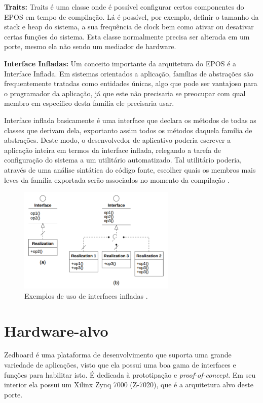 \documentclass{ufscThesis/ufscThesis} %
\begin{document}
\textbf{Traits:} Traits é uma classe onde é possível configurar certos componentes do EPOS em tempo de compilação. Lá é possível, por exemplo, definir o tamanho da stack e heap do sistema, a sua frequência de clock bem como ativar ou desativar certas funções do sistema. Esta classe normalmente precisa ser alterada em um porte, mesmo ela não sendo um mediador de hardware.

\textbf{Interface Infladas: } Um conceito importante da arquitetura do EPOS é a Interface Inflada. %
Em sistemas orientados a aplicação, famílias de abstrações são frequentemente tratadas como entidades únicas, algo que pode ser vantajoso para o programador da aplicação, já que este não precisaria se preocupar com qual membro em específico desta família ele precisaria usar\cite{guto_thesis}.

Interface inflada basicamente é uma interface que declara os métodos de todas as classes que derivam dela, exportanto assim todos os métodos daquela família de abstrações. Deste modo, o desenvolvedor de aplicativo poderia escrever a aplicação inteira em termos da interface inflada, relegando a tarefa de configuração do sistema a um utilitário automatizado. Tal utilitário poderia, através de uma análise sintática do código fonte, escolher quais os membros mais leves da família exportada serão associados no momento da compilação \cite[p.~56]{guto_thesis}.

\begin{figure}[ht!]
    \centering
    \includegraphics[width=7.5cm]{figuras/inflated_interface}
    \caption{Exemplos de uso de interfaces infladas \cite{guto_thesis}.}
\end{figure}


\section{Hardware-alvo}
Zedboard é uma plataforma de desenvolvimento que suporta uma grande variedade de aplicações, visto que ela possui uma boa gama de interfaces e funções para habilitar isto. É dedicada à prototipação e \emph{proof-of-concept}. Em seu interior ela possui um Xilinx Zynq 7000 (Z-7020), que é a arquitetura alvo deste porte.
\end{document}
